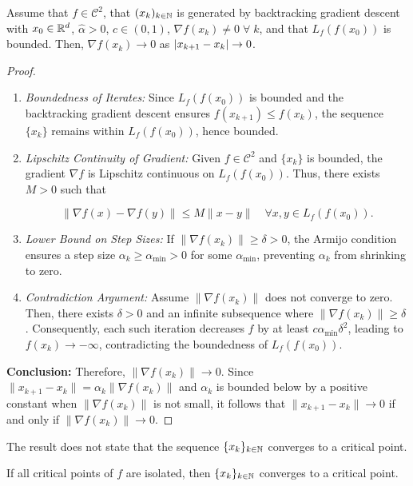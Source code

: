 \begin{theorem}{}{}
  Assume that  \(f \in \mathcal{C}^2\), that  \((x_k)_{k \in \mathbb{N}}\)
  is generated by backtracking gradient descent with
  \(x_0 \in \mathbb{R}^d\),  \(\hat{\alpha} > 0\), \(c \in (0, 1)\),  \(\nabla f(x_k) \neq 0 \; \forall \; k\), and that
  \(L_f(f(x_0))\) is bounded. Then,  \(\nabla f(x_k) \to 0\) as  \(\lvert x_{k+1} - x_k\rvert \to 0\).
\end{theorem}

\begin{proof}{}{}
  \begin{enumerate}
    \item \textit{Boundedness of Iterates:} Since  \(L_f(f(x_0))\) is bounded and the backtracking gradient descent ensures  \(f(x_{k+1}) \leq f(x_k)\), the sequence  \(\{x_k\}\) remains within  \(L_f(f(x_0))\), hence bounded.
    \item \textit{Lipschitz Continuity of Gradient:} Given  \(f \in \mathcal{C}^2\) and  \(\{x_k\}\) is bounded, the gradient  \(\nabla f\) is Lipschitz continuous on  \(L_f(f(x_0))\). Thus, there exists  \(M > 0\) such that

          \[
            \|\nabla f(x) - \nabla f(y)\| \leq M \|x - y\| \quad \forall x, y \in L_f(f(x_0)).
          \]

    \item \textit{Lower Bound on Step Sizes:} If  \(\|\nabla f(x_k)\| \geq \delta > 0\), the Armijo condition ensures a step size  \(\alpha_k \geq \alpha_{\min} > 0\) for some  \(\alpha_{\min}\), preventing  \(\alpha_k\) from shrinking to zero.
    \item \textit{Contradiction Argument:} Assume  \(\|\nabla f(x_k)\|\) does not converge to zero. Then, there exists  \(\delta > 0\) and an infinite subsequence where  \(\|\nabla f(x_k)\| \geq \delta\). Consequently, each such iteration decreases  \(f\) by at least  \(c \alpha_{\min} \delta^2\), leading to  \(f(x_k) \to -\infty\), contradicting the boundedness of  \(L_f(f(x_0))\).
  \end{enumerate}

  \textbf{Conclusion:} Therefore,  \(\|\nabla f(x_k)\| \to 0\). Since  \(\|x_{k+1} - x_k\| = \alpha_k \|\nabla f(x_k)\|\) and  \(\alpha_k\) is bounded below by a positive constant when  \(\|\nabla f(x_k)\|\) is not small, it follows that  \(\|x_{k+1} - x_k\| \to 0\) if and only if  \(\|\nabla f(x_k)\| \to 0\).

\end{proof}

\begin{remark}{}{}

  The result does not state that the sequence  \(\{x_k\}_{k \in \mathbb{N}}\) converges to a critical point.

  If all critical points of  \(f\) are isolated, then  \(\{x_k\}_{k \in \mathbb{N}}\) converges to a critical point.
\end{remark}


